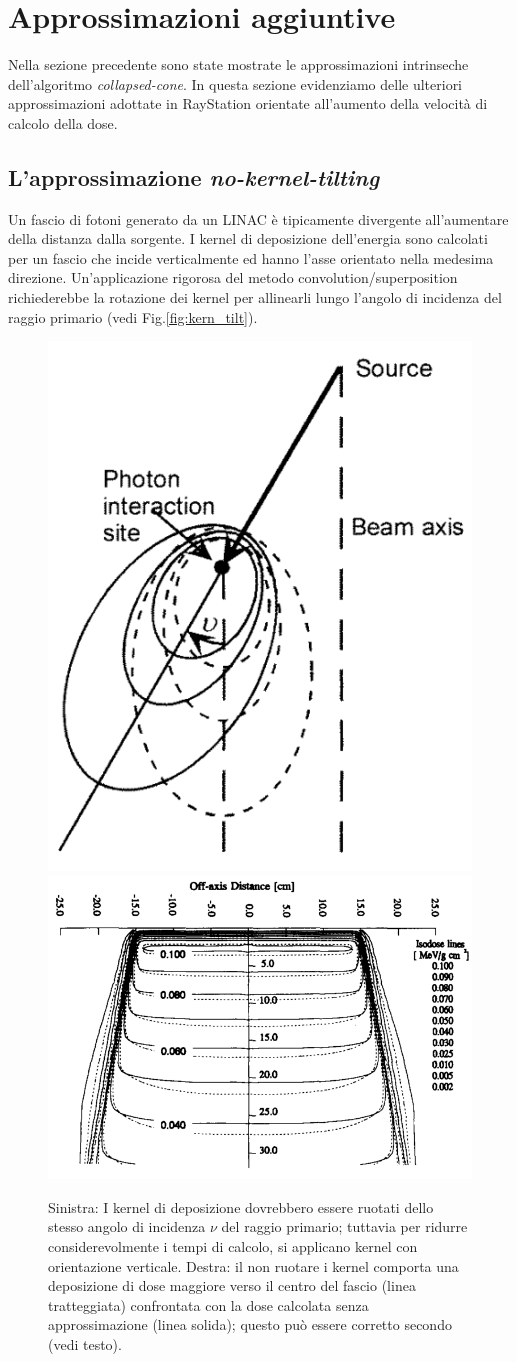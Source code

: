 {\section{Approssimazioni aggiuntive}
Nella sezione precedente sono state mostrate le approssimazioni intrinseche dell'algoritmo \textit{collapsed-cone}. In questa sezione evidenziamo delle ulteriori approssimazioni adottate in RayStation orientate all'aumento della velocità di calcolo della dose.

\subsection{L'approssimazione \textit{no-kernel-tilting}}
Un fascio di fotoni generato da un LINAC è tipicamente divergente all'aumentare della distanza dalla sorgente. I kernel di deposizione dell'energia sono calcolati per un fascio che incide verticalmente ed hanno l'asse orientato nella medesima direzione. Un'applicazione rigorosa del metodo convolution/superposition richiederebbe la rotazione dei kernel per allinearli lungo l'angolo di incidenza del raggio primario (vedi Fig.\ref{fig:kern_tilt}).\\
\begin{figure}
\centering
\includegraphics[width=.35\textwidth]{./cap1/kern_tilt.png}
\includegraphics[width=.6\textwidth]{./cap1/kern_tilt_b.png}
\caption{Sinistra: I kernel di deposizione dovrebbero essere ruotati dello stesso angolo di incidenza $\nu$ del raggio primario; tuttavia per ridurre considerevolmente i tempi di calcolo, si applicano kernel con orientazione verticale. Destra: il non ruotare i kernel comporta una deposizione di dose maggiore verso il centro del fascio (linea tratteggiata) confrontata con la dose calcolata senza approssimazione (linea solida); questo può essere corretto secondo \cite{Papanikolaou1993} (vedi testo).} 

\end{figure}}
